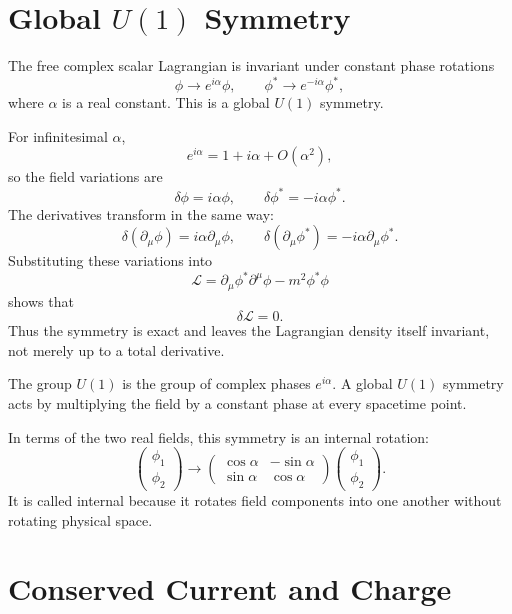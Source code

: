 \section{Global \texorpdfstring{\(U(1)\)}{U(1)} Symmetry}

The free complex scalar Lagrangian is invariant under constant phase rotations
\[
    \phi\longrightarrow e^{i\alpha}\phi,
    \qquad
    \phi^*\longrightarrow e^{-i\alpha}\phi^*,
\]
where \(\alpha\) is a real constant. This is a global \(U(1)\) symmetry.

For infinitesimal \(\alpha\),
\[
    e^{i\alpha}=1+i\alpha+O(\alpha^2),
\]
so the field variations are
\[
    \delta\phi=i\alpha\phi,
    \qquad
    \delta\phi^*=-i\alpha\phi^*.
\]
The derivatives transform in the same way:
\[
    \delta(\partial_\mu\phi)=i\alpha\partial_\mu\phi,
    \qquad
    \delta(\partial_\mu\phi^*)=-i\alpha\partial_\mu\phi^*.
\]
Substituting these variations into
\[
    \mathcal{L}
    =\partial_\mu\phi^*\partial^\mu\phi-m^2\phi^*\phi
\]
shows that
\[
    \delta\mathcal{L}=0.
\]
Thus the symmetry is exact and leaves the Lagrangian density itself invariant,
not merely up to a total derivative.

\begin{definitionbox}
The group \(U(1)\) is the group of complex phases \(e^{i\alpha}\). A global
\(U(1)\) symmetry acts by multiplying the field by a constant phase at every
spacetime point.
\end{definitionbox}

In terms of the two real fields, this symmetry is an internal rotation:
\[
    \begin{pmatrix}\phi_1\\ \phi_2\end{pmatrix}
    \longrightarrow
    \begin{pmatrix}
    \cos\alpha & -\sin\alpha\\
    \sin\alpha & \cos\alpha
    \end{pmatrix}
    \begin{pmatrix}\phi_1\\ \phi_2\end{pmatrix}.
\]
It is called internal because it rotates field components into one another
without rotating physical space.

\section{Conserved Current and Charge}

